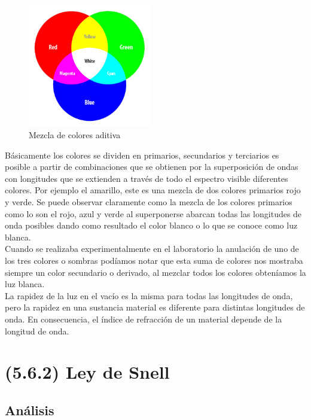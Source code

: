 \documentclass{article}
\begin{document}
\begin{figure}
    \centering
    \includegraphics[width=0.48\textwidth]{1}
    \caption{Mezcla de colores aditiva}
    \label{fig:my_label}
\end{figure}

Básicamente los colores se dividen en primarios, secundarios y terciarios es posible a partir de combinaciones que se obtienen por la superposición de ondas con longitudes que se extienden a través de todo el espectro visible diferentes colores. Por ejemplo el amarillo, este es una mezcla de dos colores primarios rojo y verde. Se puede observar claramente como la mezcla de los colores primarios como lo son el rojo, azul y verde al superponerse abarcan todas las longitudes de onda posibles dando como resultado el color blanco o lo que se conoce como luz blanca. 
\\
Cuando se realizaba experimentalmente en el laboratorio la anulación de uno de los tres colores o sombras podíamos notar que esta suma de colores nos mostraba siempre un color secundario o derivado, al mezclar todos los colores obteníamos la luz blanca.
\\
La rapidez de la luz en el vacío es la misma para todas las longitudes de onda, pero la rapidez en una sustancia material es diferente para distintas longitudes de onda. En consecuencia, el índice de refracción de un material depende de la longitud de onda.







\section{(5.6.2) Ley de Snell}
\subsection{Análisis}
\end{document}
